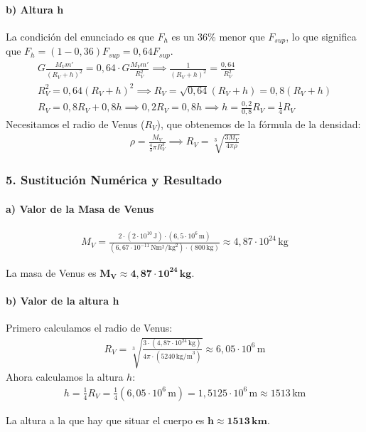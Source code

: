 \paragraph*{b) Altura h}
La condición del enunciado es que $F_h$ es un 36\% menor que $F_{sup}$, lo que significa que $F_h = (1 - 0,36) F_{sup} = 0,64 F_{sup}$.
\begin{gather}
    G \frac{M_V m'}{(R_V+h)^2} = 0,64 \cdot G \frac{M_V m'}{R_V^2} \implies \frac{1}{(R_V+h)^2} = \frac{0,64}{R_V^2} \nonumber \\[8pt]
    R_V^2 = 0,64 (R_V+h)^2 \implies R_V = \sqrt{0,64} (R_V+h) = 0,8 (R_V+h) \nonumber \\[8pt]
    R_V = 0,8 R_V + 0,8 h \implies 0,2 R_V = 0,8 h \implies h = \frac{0,2}{0,8} R_V = \frac{1}{4} R_V
\end{gather}
Necesitamos el radio de Venus ($R_V$), que obtenemos de la fórmula de la densidad:
\begin{gather}
    \rho = \frac{M_V}{\frac{4}{3}\pi R_V^3} \implies R_V = \sqrt[3]{\frac{3 M_V}{4 \pi \rho}}
\end{gather}

\subsubsection*{5. Sustitución Numérica y Resultado}
\paragraph*{a) Valor de la Masa de Venus}
\begin{gather}
    M_V = \frac{2 \cdot (2 \cdot 10^{10}\,\text{J}) \cdot (6,5 \cdot 10^6\,\text{m})}{(6,67 \cdot 10^{-11}\,\text{N}\text{m}^2/\text{kg}^2) \cdot (800\,\text{kg})} \approx 4,87 \cdot 10^{24} \, \text{kg}
\end{gather}
\begin{cajaresultado}
    La masa de Venus es $\boldsymbol{M_V \approx 4,87 \cdot 10^{24} \, \textbf{kg}}$.
\end{cajaresultado}
\paragraph*{b) Valor de la altura h}
Primero calculamos el radio de Venus:
\begin{gather}
    R_V = \sqrt[3]{\frac{3 \cdot (4,87 \cdot 10^{24}\,\text{kg})}{4 \pi \cdot (5240\,\text{kg/m}^3)}} \approx 6,05 \cdot 10^6 \, \text{m}
\end{gather}
Ahora calculamos la altura $h$:
\begin{gather}
    h = \frac{1}{4} R_V = \frac{1}{4} (6,05 \cdot 10^6 \, \text{m}) = 1,5125 \cdot 10^6 \, \text{m} \approx 1513 \, \text{km}
\end{gather}
\begin{cajaresultado}
    La altura a la que hay que situar el cuerpo es $\boldsymbol{h \approx 1513 \, \textbf{km}}$.
\end{cajaresultado}

